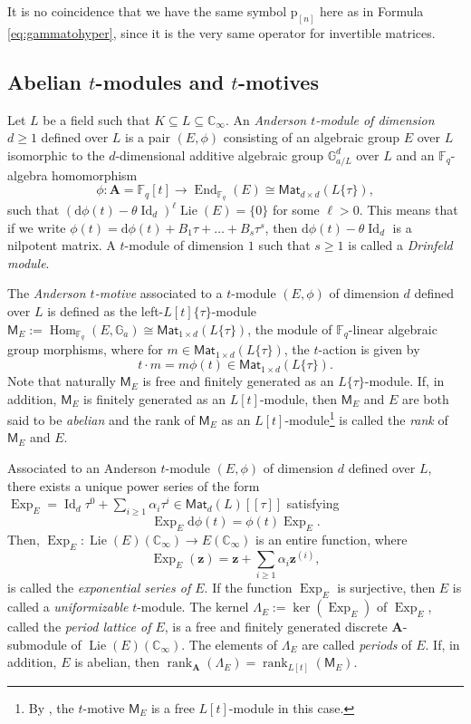 \documentclass[10pt,a4paper]{amsart}
\theoremstyle{plain} %
\theoremstyle{definition}
\theoremstyle{remark}
\newcommand{\CC}{\mathbb{C}}
\newcommand{\FF}{\mathbb{F}}
\newcommand{\GG}{\mathbb{G}}
\newcommand{\bA}{\mathbf{A}}
\newcommand{\bsz}{\boldsymbol{z}}
\newcommand{\rd}{\mathrm{d}}
\newcommand{\Exp}{\operatorname{Exp}}
\newcommand{\Hom}{\operatorname{Hom}}
\newcommand{\End}{\operatorname{End}}
\newcommand{\Id}{\operatorname{Id}}
\newcommand{\Fq}{\FF_{\!q}}  %
\newcommand{\rk}{\operatorname{rank}}
\newcommand{\Mat}{\mathsf{Mat}}
\newcommand{\Lie}{\operatorname{Lie}}
\newcommand{\mot}{\mathsf{M}}  %
\newcommand{\power}[2]{{#1 [\![ #2 ]\!]}} %
\newcommand{\prol}[1]{\mathrm{p}_{[#1]}}
\numberwithin{equation}{subsection}
\begin{document}
It is no coincidence that we have the same symbol $\prol{n}$ here as in Formula \ref{eq:gammatohyper}, since it is the very same operator for invertible matrices.


\subsection{Abelian \texorpdfstring{$t$}{t}-modules and  \texorpdfstring{$t$}{t}-motives} \label{SubS:motive}


 Let $L$ be a field such that $K\subseteq L \subseteq \CC_\infty$. An \emph{Anderson $t$-module of dimension $d\geq 1$} defined over $L$ is a pair $(E, \phi)$ consisting of  an algebraic group $E$  over $L$ isomorphic to the $d$-dimensional additive algebraic group $\GG_{a/L}^d$ over $L$ and an $\Fq$-algebra homomorphism
\[
\phi: \bA=\Fq[t] \longrightarrow \End_{\FF_q}(E) \cong \Mat_{d\times d}(L\{\tau\}), 
\]
  such that 
  $(\rd\phi(t)-\theta\Id_d)^\ell \Lie(E)=\{0\}$ for some $\ell>0$. 
  This means that if we write $\phi(t)= \rd \phi(t)  + B_1 \tau + \dots + B_s\tau^s$, then $\rd \phi(t)  - \theta \Id_d$ is a nilpotent matrix. 
  A $t$-module of dimension $1$ such that $s\geq 1$ is called a \emph{Drinfeld module}. 
  

The \emph{Anderson $t$-motive}  associated to a $t$-module $(E, \phi)$ of dimension $d$ defined over $L$ is defined as the left-$L[t]\{\tau\}$-module $\mot_E :=\Hom_{\Fq}(E, \GG_a) \cong \Mat_{1 \times d}(L\{\tau\})$, the module of $\Fq$-linear algebraic group morphisms, where for $m \in  \Mat_{1 \times d}(L\{\tau\})$, the $t$-action is given by
\[
t\cdot m = m \phi(t)\in  \Mat_{1 \times d}(L\{\tau\}). 
\]
Note that naturally $\mot_E$ is free and finitely generated as an $L\{\tau\}$-module. If, in addition, $\mot_E$ is finitely generated as an $L[t]$-module, then $\mot_E$ and $E$ are both said to be \emph{abelian} and the rank of $\mot_E$ as an $L[t]$-module\footnote{By \cite[Lemma 1.4.5]{ga:tm}, the $t$-motive $\mot_E$ is a free $L[t]$-module in this case.} is called the \emph{rank} of $\mot_E$ and $E$.

Associated to an Anderson $t$-module $(E, \phi)$ of dimension $d$ defined over $L$, there exists a unique power series of the form $\Exp_E= \Id_d \tau^0 + \sum_{i\geq 1} \alpha_i \tau^i \in \power{\Mat_d(L)}{\tau}$ satisfying
\[
\Exp_E \rd\phi(t) = \phi(t)\Exp_E.
\] 
Then, $\Exp_E: \Lie(E)(\CC_\infty) \rightarrow E(\CC_\infty)$ 
is an entire function, where 
\[
\Exp_E(\bsz) = \bsz + \sum_{i\geq 1} \alpha_i \bsz^{(i)},
\]
is called the \emph{exponential series of $E$}. If the function $\Exp_E$ is surjective, then $E$ is called a \emph{uniformizable} $t$-module. The kernel $\Lambda_E:= \ker(\Exp_E)$ of $\Exp_E$, called the \emph{period lattice of $E$}, is a free and finitely generated discrete $\bA$-submodule of $\Lie(E)(\CC_\infty)$. The elements of $\Lambda_E$ are called \emph{periods} of $E$. 
If, in addition, $E$ is abelian, then $\rk_{\bA}(\Lambda_E) = \rk_{L[t]}(\mot_E)$. 
\end{document}
